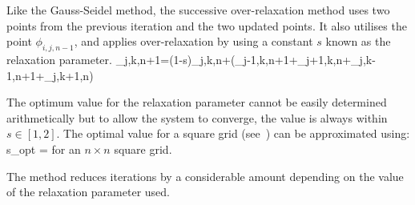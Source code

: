 Like the Gauss-Seidel method, the successive over-relaxation method uses two
points from the previous iteration and the two updated points. It also
utilises the point $\phi_{i,j,n-1}$, and applies over-relaxation by using a
constant $s$ known as the relaxation parameter.
%
\be
\phi_{j,k,n+1}=(1-s)\phi_{j,k,n}+(\phi_{j-1,k,n+1}+\phi_{j+1,k,n}+\phi_{j,k-1,n+1}+\phi_{j,k+1,n})
\ee

The optimum value for the relaxation parameter cannot be easily determined
arithmetically but to allow the system to converge, the value is always
within $s\in[1,2]$. The optimal value for a square grid (see~\cite{sor})
can be approximated using:
%
\be
 s_{opt} =  \approx {}
\ee
%
for an $n \times n$ square grid.

The method reduces iterations by a considerable amount depending on the value
of the relaxation parameter used.
